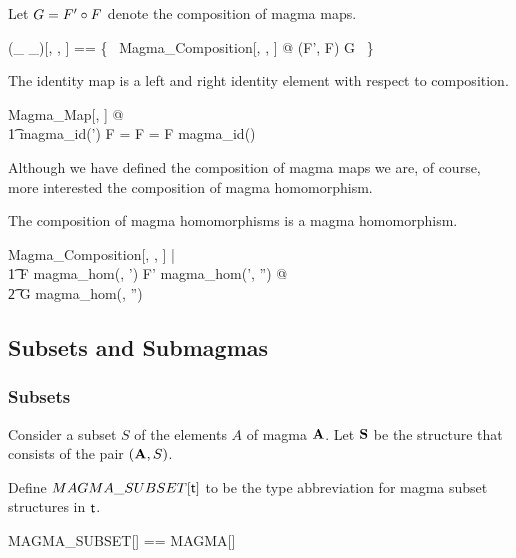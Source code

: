 \documentclass{amsart}
\begin{document}
Let $G = F' \mathbin{\circ} F$ denote the composition of magma maps.

\begin{zed}
	(\_ \compMagma \_)[\genT, \genU, \genV] == \{~ Magma\_Composition[\genT, \genU, \genV] @ (F', F) \mapsto G ~\}
\end{zed}

\begin{remark}
The identity map is a left and right identity element with respect to composition.

\begin{zed}
	\forall Magma\_Map[\setT, \setU] @ \\
	\t1 magma\_id(\strucA') \compMagma F = F = F \compMagma magma\_id(\strucA)
\end{zed}

\end{remark}

Although we have defined the composition of magma maps we are, of course, more interested
the composition of magma homomorphism.

\begin{remark}
The composition of magma homomorphisms is a magma homomorphism.

\begin{zed}
	\forall Magma\_Composition[\setT, \setU, \setV] | \\
	\t1	F \in magma\_hom(\strucA, \strucA') \land F' \in magma\_hom(\strucA', \strucA'') @ \\
	\t2		G \in magma\_hom(\strucA, \strucA'')
\end{zed}

\end{remark}

\subsection{Subsets and Submagmas}

\subsubsection{Subsets}

Consider a subset $S$ of the elements $A$ of magma $\mathbf{A}$.
Let $\mathbf{S}$ be the structure that consists of the pair $(\mathbf{A}, S)$.

Define $MAGMA\_SUBSET[\mathsf{t}]$ to be the type abbreviation for magma subset 
structures in $\mathsf{t}$.

\begin{zed}
	MAGMA\_SUBSET[\genT] == MAGMA[\genT] \cross \power \genT
\end{zed}
\end{document}
